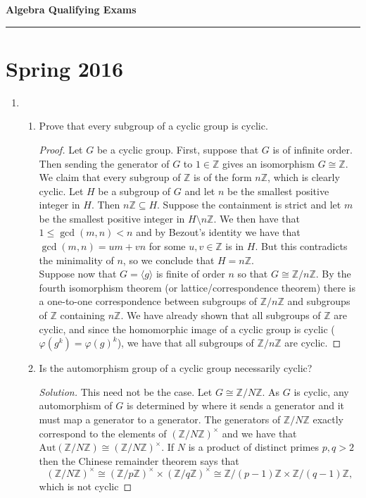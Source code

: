 \documentclass[11pt,letterpaper]{report}
\newcommand{\integers}{\mathbb{Z}}
\newcommand{\Aut}{\text{Aut}}
\newenvironment{solution}
{\begin{proof}[Solution]}
{\end{proof}}
\begin{document}
\begin{center}
{\bf \Large Algebra Qualifying Exams} %
\vspace{0.2cm}
\hrule
\end{center}

\section*{Spring 2016}
\begin{enumerate}
	\item 
	\begin{enumerate}
		\item Prove that every subgroup of a cyclic group is cyclic.
		\begin{proof}
			Let $G$ be a cyclic group. First, suppose that $G$ is of infinite order. Then sending the generator of $G$ to $1\in \integers$ gives an isomorphism $G\cong \integers$. We claim that every subgroup of $\integers$ is of the form $n\integers$, which is clearly cyclic. Let $H$ be a subgroup of $G$ and let $n$ be the smallest positive integer in $H$. Then $n\integers \subseteq H$. Suppose the containment is strict and let $m$ be the smallest positive integer in $H\setminus n\integers$. We then have that $1\leq \gcd(m,n)<n$ and by Bezout's identity we have that $\gcd(m,n) = um+vn$ for some $u,v\in \integers$ is in $H$. But this contradicts the minimality of $n$, so we conclude that $H= n\integers$.\\

			\noindent Suppose now that $G = \langle g\rangle$ is finite of order $n$ so that $G\cong \integers/n\integers$. By the fourth isomorphism theorem (or lattice/correspondence theorem) there is a one-to-one correspondence between subgroups of $\integers/n\integers$ and subgroups of $\integers$ containing $n\integers$. We have already shown that all subgroups of $\integers$ are cyclic, and since the homomorphic image of a cyclic group is cyclic ($\varphi(g^k) = \varphi(g)^k$), we have that all subgroups of $\integers/n\integers$ are cyclic.
		\end{proof}

		\item Is the automorphism group of a cyclic group necessarily cyclic?
		\begin{solution}
			This need not be the case. Let $G \cong \integers/N\integers$. As $G$ is cyclic, any automorphism of $G$ is determined by where it sends a generator and it must map a generator to a generator. The generators of $\integers/N\integers$ exactly correspond to the elements of $(\integers/N\integers)^\times$ and we have that $\Aut(\integers/N\integers) \cong (\integers/N\integers)^\times$. If $N$ is a product of distinct primes $p, q>2$ then the Chinese remainder theorem says that
			\[
			(\integers/N\integers)^\times \cong (\integers/p\integers)^\times \times (\integers/q\integers)^\times \cong \integers/(p-1)\integers \times \integers/(q-1)\integers,
			\]
			which is not cyclic
		\end{solution}
	\end{enumerate}


\end{enumerate}
\end{document}
